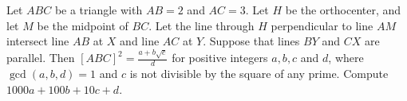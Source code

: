 Let $ABC$ be a triangle with $AB=2$ and $AC=3$. Let $H$ be the orthocenter, and let $M$ be the midpoint of $BC$. Let the line through $H$ perpendicular to line $AM$ intersect line $AB$ at $X$ and line $AC$ at $Y$. Suppose that lines $BY$ and $CX$ are parallel. Then $[ABC]^2=\frac{a+b\sqrt{c}}{d}$ for positive integers $a,b,c$ and $d$, where $\gcd(a,b,d)=1$ and $c$ is not divisible by the square of any prime. Compute $1000a+100b+10c+d$.
